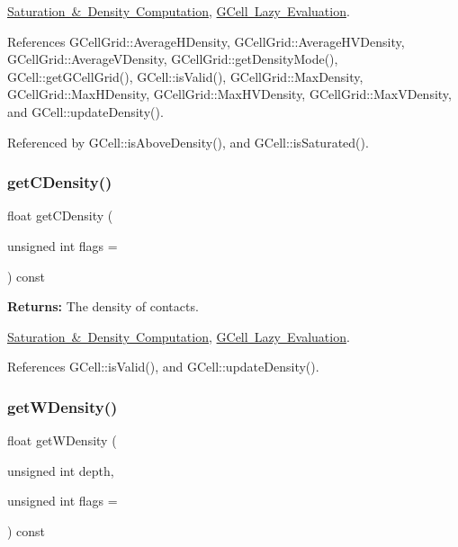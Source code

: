 \mbox{\hyperlink{classKatabatic_1_1GCell_secGCellDensity}{Saturation \& Density Computation}}, \mbox{\hyperlink{classKatabatic_1_1GCell_secGCellLazyEvaluation}{G\+Cell Lazy Evaluation}}. 

References G\+Cell\+Grid\+::\+Average\+H\+Density, G\+Cell\+Grid\+::\+Average\+H\+V\+Density, G\+Cell\+Grid\+::\+Average\+V\+Density, G\+Cell\+Grid\+::get\+Density\+Mode(), G\+Cell\+::get\+G\+Cell\+Grid(), G\+Cell\+::is\+Valid(), G\+Cell\+Grid\+::\+Max\+Density, G\+Cell\+Grid\+::\+Max\+H\+Density, G\+Cell\+Grid\+::\+Max\+H\+V\+Density, G\+Cell\+Grid\+::\+Max\+V\+Density, and G\+Cell\+::update\+Density().



Referenced by G\+Cell\+::is\+Above\+Density(), and G\+Cell\+::is\+Saturated().

\mbox{\label{classKatabatic_1_1GCell_ae56b981fad5960835faef809ec282cfa}} 
\subsubsection{\texorpdfstring{get\+C\+Density()}{getCDensity()}}
{\footnotesize\ttfamily float get\+C\+Density (\begin{DoxyParamCaption}\item[{unsigned int}]{flags = {} }\end{DoxyParamCaption}) const\hspace{0.3cm}{\ttfamily [inline]}}

{\bfseries Returns\+:} The density of contacts.

\mbox{\hyperlink{classKatabatic_1_1GCell_secGCellDensity}{Saturation \& Density Computation}}, \mbox{\hyperlink{classKatabatic_1_1GCell_secGCellLazyEvaluation}{G\+Cell Lazy Evaluation}}. 

References G\+Cell\+::is\+Valid(), and G\+Cell\+::update\+Density().

\mbox{\label{classKatabatic_1_1GCell_aa64538731e911c60eeaea557be1c7740}} 
\subsubsection{\texorpdfstring{get\+W\+Density()}{getWDensity()}}
{\footnotesize\ttfamily float get\+W\+Density (\begin{DoxyParamCaption}\item[{unsigned int}]{depth,  }\item[{unsigned int}]{flags = {} }\end{DoxyParamCaption}) const\hspace{0.3cm}{\ttfamily [inline]}}

